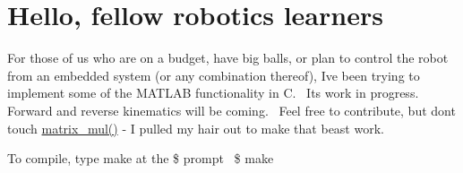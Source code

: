 \section*{Hello, fellow robotics learners}

For those of us who are on a budget, have big balls, or plan to control the robot from an embedded system (or any combination thereof), I\textquotesingle{}ve been trying to implement some of the M\+A\+T\+L\+AB functionality in C.~\newline
 I\textquotesingle{}ts work in progress. Forward and reverse kinematics will be coming.~\newline
 Feel free to contribute, but don\textquotesingle{}t touch \hyperlink{matrix_8c_a1e8d8c0421f716763d5bbb5c39af0e5b}{matrix\+\_\+mul()} -\/ I pulled my hair out to make that beast work.

To compile, type make at the \$ prompt~\newline
 \$ make 